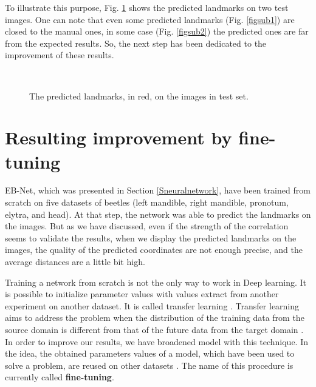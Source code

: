 \documentclass[review]{elsarticle}
\begin{document}
To illustrate this purpose, Fig. \ref{figrsexample} shows the predicted landmarks on two test images. One can note that even some predicted landmarks (Fig. \ref{figsub1}) are closed to the manual ones, in some case (Fig. \ref{figsub2}) the predicted ones are far from the expected results. So, the next step has been dedicated to the improvement of these results.
\begin{figure}[htbp]
    \centering
    ~~
\\    
    \caption{The predicted landmarks, in red,  on the images in test set.}
    \label{figrsexample}
\end{figure}
\section{Resulting improvement by fine-tuning}
\label{sfineTuning}
EB-Net, which was presented in Section \ref{Sneuralnetwork}, have been trained from scratch on five datasets of beetles (left mandible, right mandible, pronotum, elytra, and head). At that step, the network was able to predict the landmarks on the images. But as we have discussed, even if the strength of the correlation seems to validate the results, when we display the predicted landmarks on the images, the quality of the predicted coordinates are not enough precise, and the average distances are a little bit high.

Training a network from scratch is not the only way to work in Deep learning. It is possible to initialize parameter values with values extract from another experiment on another dataset. It is called transfer learning \cite{torrey2009transfer}. Transfer learning aims
to address the problem when the distribution of the training
data from the source domain is different from that of the future data from the target domain \cite{lin2016homemade}. In order to improve our results, we have broadened model with this technique. In the idea, the obtained parameters values of a model, which have been used to solve a problem, are reused on other datasets \cite{margeta_mri}. The name of this procedure is currently called \textbf{fine-tuning}.
\end{document}
